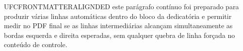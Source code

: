 UFCFRONTMATTERALIGNDED este parágrafo contínuo foi preparado para produzir várias linhas automáticas dentro do bloco da dedicatória e permitir medir no PDF final se as linhas intermediárias alcançam simultaneamente as bordas esquerda e direita esperadas, sem qualquer quebra de linha forçada no conteúdo de controle.
